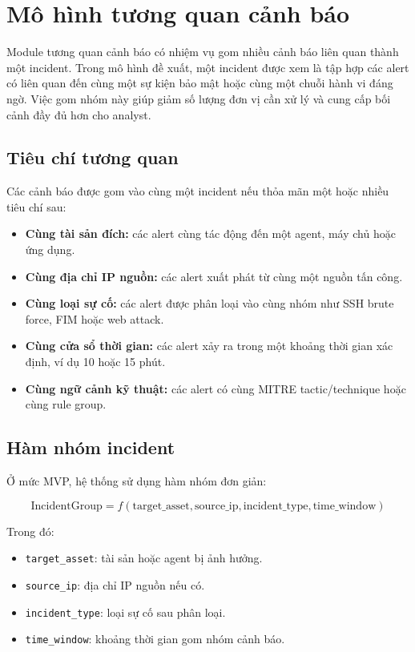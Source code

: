 \documentclass[a4paper,12pt,oneside]{book}
\begin{document}
\section{Mô hình tương quan cảnh báo}
{\fontsize{13pt}{15.6pt}\selectfont

Module tương quan cảnh báo có nhiệm vụ gom nhiều cảnh báo liên quan thành một incident. Trong mô hình đề xuất, một incident được xem là tập hợp các alert có liên quan đến cùng một sự kiện bảo mật hoặc cùng một chuỗi hành vi đáng ngờ. Việc gom nhóm này giúp giảm số lượng đơn vị cần xử lý và cung cấp bối cảnh đầy đủ hơn cho analyst.

\subsection{Tiêu chí tương quan}
{\fontsize{13pt}{15.6pt}\selectfont

Các cảnh báo được gom vào cùng một incident nếu thỏa mãn một hoặc nhiều tiêu chí sau:

\begin{itemize}
    \item \textbf{Cùng tài sản đích:} các alert cùng tác động đến một agent, máy chủ hoặc ứng dụng.
    \item \textbf{Cùng địa chỉ IP nguồn:} các alert xuất phát từ cùng một nguồn tấn công.
    \item \textbf{Cùng loại sự cố:} các alert được phân loại vào cùng nhóm như SSH brute force, FIM hoặc web attack.
    \item \textbf{Cùng cửa sổ thời gian:} các alert xảy ra trong một khoảng thời gian xác định, ví dụ 10 hoặc 15 phút.
    \item \textbf{Cùng ngữ cảnh kỹ thuật:} các alert có cùng MITRE tactic/technique hoặc cùng rule group.
\end{itemize}

}

\subsection{Hàm nhóm incident}
{\fontsize{13pt}{15.6pt}\selectfont

Ở mức MVP, hệ thống sử dụng hàm nhóm đơn giản:

\[
\mathrm{IncidentGroup} = f(\mathrm{target\_asset}, \mathrm{source\_ip}, \mathrm{incident\_type}, \mathrm{time\_window})
\]

\noindent Trong đó:

\begin{itemize}
    \item \texttt{target\_asset}: tài sản hoặc agent bị ảnh hưởng.
    \item \texttt{source\_ip}: địa chỉ IP nguồn nếu có.
    \item \texttt{incident\_type}: loại sự cố sau phân loại.
    \item \texttt{time\_window}: khoảng thời gian gom nhóm cảnh báo.
\end{itemize}

}}
\end{document}

